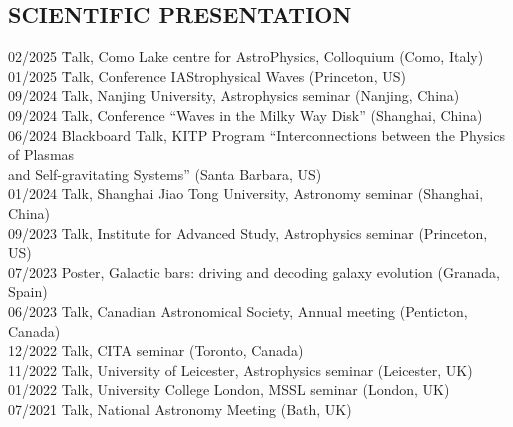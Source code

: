 \documentclass[]{res}
\begin{document}
\begin{resume}
\section{SCIENTIFIC PRESENTATION}
\noindent
\begin{tabbing}
    02/2025 \hspace{2mm} \=Talk, Como Lake centre for AstroPhysics, Colloquium (Como, Italy)\\
    01/2025 \hspace{2mm} \=Talk, Conference IAStrophysical Waves (Princeton, US)\\
    09/2024 \hspace{2mm} \>Talk, Nanjing University, Astrophysics seminar (Nanjing, China)\\
    09/2024 \hspace{2mm} \>Talk, Conference ``Waves in the Milky Way Disk'' (Shanghai, China)\\
    06/2024 \hspace{2mm} \>Blackboard Talk, KITP Program ``Interconnections between the Physics of Plasmas\\
                         \>and Self-gravitating Systems'' (Santa Barbara, US)\\
    01/2024 \hspace{2mm} \>Talk, Shanghai Jiao Tong University, Astronomy seminar (Shanghai, China)\\
    09/2023 \hspace{2mm} \>Talk, Institute for Advanced Study, Astrophysics seminar (Princeton, US)\\
    07/2023 \hspace{2mm} \>Poster, Galactic bars: driving and decoding galaxy evolution (Granada, Spain)\\
    06/2023 \hspace{2mm} \>Talk, Canadian Astronomical Society, Annual meeting (Penticton, Canada)\\
    12/2022 \hspace{2mm} \>Talk, CITA seminar (Toronto, Canada)\\
    11/2022 \hspace{2mm} \>Talk, University of Leicester, Astrophysics seminar (Leicester, UK)\\
    01/2022 \hspace{2mm} \>Talk, University College London, MSSL seminar (London, UK)\\
    07/2021 \hspace{2mm} \>Talk, National Astronomy Meeting (Bath, UK)\\

\end{tabbing}
\end{resume}
\end{document}
